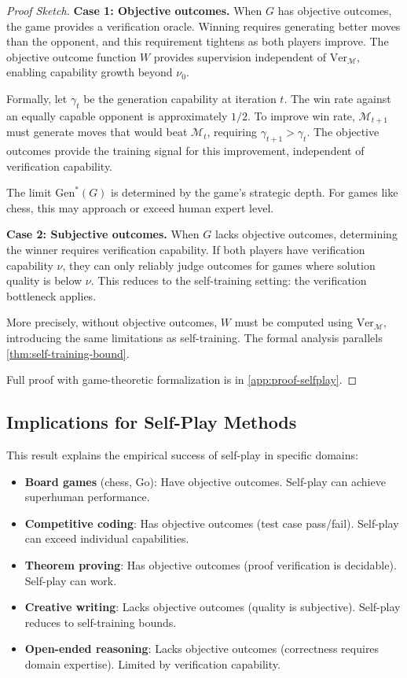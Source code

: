 \documentclass{article}
\theoremstyle{definition}
\theoremstyle{remark}
\newcommand{\M}{\mathcal{M}}  %
\newcommand{\Gen}{\text{Gen}}  %
\newcommand{\Ver}{\text{Ver}}  %
\begin{document}
\begin{proof}[Proof Sketch]
\textbf{Case 1: Objective outcomes.} When \(G\) has objective outcomes, the game provides a verification oracle. Winning requires generating better moves than the opponent, and this requirement tightens as both players improve. The objective outcome function \(W\) provides supervision independent of \(\Ver_{\M}\), enabling capability growth beyond \(\nu_0\).

Formally, let \(\gamma_t\) be the generation capability at iteration \(t\). The win rate against an equally capable opponent is approximately \(1/2\). To improve win rate, \(\M_{t+1}\) must generate moves that would beat \(\M_t\), requiring \(\gamma_{t+1} > \gamma_t\). The objective outcomes provide the training signal for this improvement, independent of verification capability.

The limit \(\Gen^*(G)\) is determined by the game's strategic depth. For games like chess, this may approach or exceed human expert level.

\textbf{Case 2: Subjective outcomes.} When \(G\) lacks objective outcomes, determining the winner requires verification capability. If both players have verification capability \(\nu\), they can only reliably judge outcomes for games where solution quality is below \(\nu\). This reduces to the self-training setting: the verification bottleneck applies.

More precisely, without objective outcomes, \(W\) must be computed using \(\Ver_\M\), introducing the same limitations as self-training. The formal analysis parallels \cref{thm:self-training-bound}.

Full proof with game-theoretic formalization is in \cref{app:proof-selfplay}.
\end{proof}

\subsection{Implications for Self-Play Methods}

This result explains the empirical success of self-play in specific domains:

\begin{itemize}
\item \textbf{Board games} (chess, Go): Have objective outcomes. Self-play can achieve superhuman performance.
\item \textbf{Competitive coding}: Has objective outcomes (test case pass/fail). Self-play can exceed individual capabilities.
\item \textbf{Theorem proving}: Has objective outcomes (proof verification is decidable). Self-play can work.
\item \textbf{Creative writing}: Lacks objective outcomes (quality is subjective). Self-play reduces to self-training bounds.
\item \textbf{Open-ended reasoning}: Lacks objective outcomes (correctness requires domain expertise). Limited by verification capability.
\end{itemize}
\end{document}
